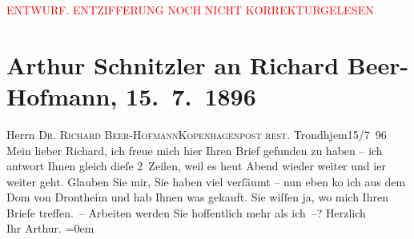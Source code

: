 
\begin{center}
            \textcolor{red}{ENTWURF. ENTZIFFERUNG NOCH NICHT KORREKTURGELESEN}
                      \end{center}
            
               \section[Arthur Schnitzler an Richard Beer-Hofmann, 15. 7. 1896]{ Arthur Schnitzler an Richard Beer-Hofmann, 15. 7. 1896}\nopagebreak{}\rehead{ }\begin{ledgroupsized}[t]{13cm}\normalsize\beginnumbering{} \toendnotes[C]{\smallbreak\pagebreak[2]} 
\pstart{}{\pb}Herrn \textsc{Dr. Richard
                     Beer-Hofmann}\pend{}\pstart{}\textsc{Kopenhagen}\pend{}\pstart{}\textsc{post rest.}\pend{}{\bigskip}\pstart
           \raggedleft{}{\pb}Trondhjem15/7 96\pend
           \pstart
           Mein lieber Richard, ich freue mich hier Ihren Brief gefunden zu
               haben – ich antwort Ihnen gleich dieſe 2 Zeilen, weil es heut Abend wieder weiter und
                  i{\geminationm}er weiter geht. Glauben Sie mir, Sie haben viel
               verſäumt – nun eben ko{\geminationm} ich aus dem Dom von Drontheim und hab Ihnen was gekauft.\pend
           \pstart
           Sie wiſſen ja, wo mich Ihren Briefe treffen. – Arbeiten werden Sie hoffentlich mehr
               als ich –?\pend
           \pstart
           Herzlich{\\[\baselineskip]}Ihr \spacefill\mbox{Arthur.}\pend
           \leftskip=0em{}\endnumbering{}\end{ledgroupsized}  \newcommand{\dateiname}{L00563}\newcommand{\titel}{Arthur Schnitzler an Richard Beer-Hofmann, 15. 7. 1896}\newcommand{\editorInnen}{Martin Anton Müller und Gerd-Hermann Susen}
      